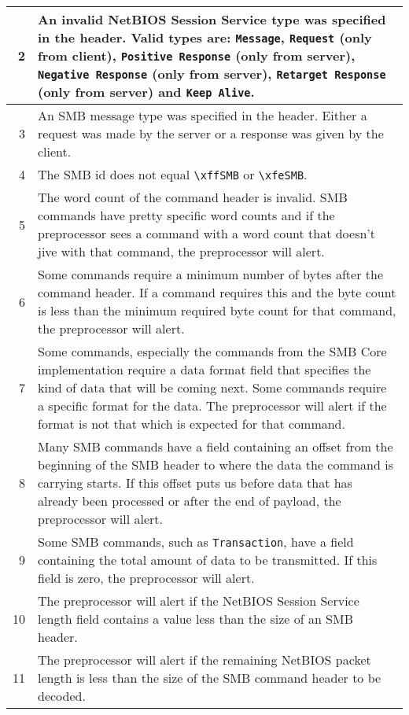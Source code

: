 \documentclass[english]{report}
\begin{document}
\begin{itemize}
\begin{longtable}{|r|p{13.5cm}|}
\hline
  2 & An invalid NetBIOS Session Service type was specified in the header.
      Valid types are: \texttt{Message}, \texttt{Request} (only from client),
      \texttt{Positive Response} (only from server), \texttt{Negative Response}
      (only from server), \texttt{Retarget Response} (only from server) and
      \texttt{Keep Alive}.\\
\hline
  3 & An SMB message type was specified in the header. Either a request was
      made by the server or a response was given by the client.\\
\hline
  4 & The SMB id does not equal \texttt{\textbackslash xffSMB} or
      \texttt{\textbackslash xfeSMB}.\\
\hline
  5 & The word count of the command header is invalid. SMB commands have
      pretty specific word counts and if the preprocessor sees a command with
      a word count that doesn't jive with that command, the preprocessor will
      alert.\\
\hline
  6 & Some commands require a minimum number of bytes after the command
      header. If a command requires this and the byte count is less than the
      minimum required byte count for that command, the preprocessor will
      alert.\\
\hline
  7 & Some commands, especially the commands from the SMB Core implementation
      require a data format field that specifies the kind of data that will be
      coming next. Some commands require a specific format for the data. The
      preprocessor will alert if the format is not that which is expected for
      that command.\\
\hline
  8 & Many SMB commands have a field containing an offset from the beginning
      of the SMB header to where the data the command is carrying starts. If
      this offset puts us before data that has already been processed or after
      the end of payload, the preprocessor will alert.\\
\hline
  9 & Some SMB commands, such as \texttt{Transaction}, have a field containing
      the total amount of data to be transmitted. If this field is zero, the
      preprocessor will alert.\\
\hline
 10 & The preprocessor will alert if the NetBIOS Session Service length field
      contains a value less than the size of an SMB header.\\
\hline
 11 & The preprocessor will alert if the remaining NetBIOS packet length is
      less than the size of the SMB command header to be decoded.\\

\end{longtable}
\end{itemize}
\end{document}

